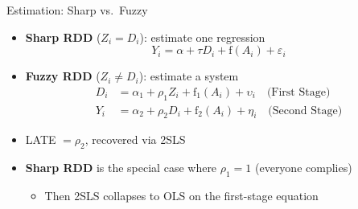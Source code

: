 \documentclass[hyperref={pdfpagelabels=false}]{beamer}
\begin{document}
\begin{frame}{Estimation: Sharp vs.\ Fuzzy}{}
	\begin{itemize}
		\item \textbf{Sharp RDD} ($Z_i = D_i$): estimate one regression
		\vspace{0.2cm}
		\begin{equation*}
			Y_i = \alpha + \tau D_i + \mathrm{f}(A_i) + \varepsilon_i
		\end{equation*}
		\vspace{0.2cm}
		\item \textbf{Fuzzy RDD} ($Z_i \neq D_i$): estimate a system
		\vspace{0.2cm}
		\begin{equation*}
			\begin{aligned}
				D_i &= \alpha_1 + \rho_1 Z_i + \mathrm{f}_1(A_i) + \upsilon_i \quad \text{(First Stage)} \\
				Y_i &= \alpha_2 + \rho_2 D_i + \mathrm{f}_2(A_i) + \eta_i \quad \text{(Second Stage)}
			\end{aligned}
		\end{equation*}
		\vspace{0.2cm}
		\item LATE $= \rho_2$, recovered via 2SLS
		\vspace{0.2cm}
		\item \textbf{Sharp RDD} is the special case where $\rho_1 = 1$ (everyone complies)
		\vspace{0.2cm}
		\begin{itemize}
			\item Then 2SLS collapses to OLS on the first-stage equation
		\end{itemize}
	\end{itemize}
\end{frame}
\end{document}

